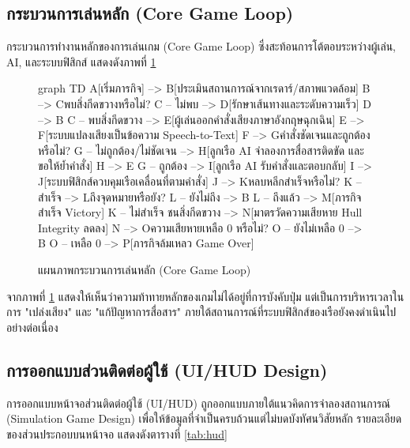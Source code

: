\subsection{กระบวนการเล่นหลัก (Core Game Loop)}

กระบวนการทำงานหลักของการเล่นเกม (Core Game Loop) ซึ่งสะท้อนการโต้ตอบระหว่างผู้เล่น, AI, และระบบฟิสิกส์ แสดงดังภาพที่ \ref{fig:gameloop}

\begin{figure}[H]
\centering
\begin{mermaid}
graph TD
    A[เริ่มภารกิจ] --> B[ประเมินสถานการณ์จากเรดาร์/สภาพแวดล้อม]
    B --> C{พบสิ่งกีดขวางหรือไม่?}
    C -- ไม่พบ --> D[รักษาเส้นทางและระดับความเร็ว]
    D --> B
    C -- พบสิ่งกีดขวาง --> E[ผู้เล่นออกคำสั่งเสียงภาษาอังกฤษฉุกเฉิน]
    E --> F[ระบบแปลงเสียงเป็นข้อความ Speech-to-Text]
    F --> G{คำสั่งชัดเจนและถูกต้องหรือไม่?}
    G -- ไม่ถูกต้อง/ไม่ชัดเจน --> H[ลูกเรือ AI จำลองการสื่อสารติดขัด และขอให้ย้ำคำสั่ง]
    H --> E
    G -- ถูกต้อง --> I[ลูกเรือ AI รับคำสั่งและตอบกลับ]
    I --> J[ระบบฟิสิกส์ควบคุมเรือเคลื่อนที่ตามคำสั่ง]
    J --> K{หลบหลีกสำเร็จหรือไม่?}
    K -- สำเร็จ --> L{ถึงจุดหมายหรือยัง?}
    L -- ยังไม่ถึง --> B
    L -- ถึงแล้ว --> M[ภารกิจสำเร็จ Victory]
    K -- ไม่สำเร็จ ชนสิ่งกีดขวาง --> N[มาตรวัดความเสียหาย Hull Integrity ลดลง]
    N --> O{ความเสียหายเหลือ 0 หรือไม่?}
    O -- ยังไม่เหลือ 0 --> B
    O -- เหลือ 0 --> P[ภารกิจล้มเหลว Game Over]
\end{mermaid}
\caption{แผนภาพกระบวนการเล่นหลัก (Core Game Loop)}
\label{fig:gameloop}
\end{figure}

จากภาพที่ \ref{fig:gameloop} แสดงให้เห็นว่าความท้าทายหลักของเกมไม่ได้อยู่ที่การบังคับปุ่ม แต่เป็นการบริหารเวลาในการ "เปล่งเสียง" และ "แก้ปัญหาการสื่อสาร" ภายใต้สถานการณ์ที่ระบบฟิสิกส์ของเรือยังคงดำเนินไปอย่างต่อเนื่อง

\subsection{การออกแบบส่วนติดต่อผู้ใช้ (UI/HUD Design)}

การออกแบบหน้าจอส่วนติดต่อผู้ใช้ (UI/HUD) ถูกออกแบบภายใต้แนวคิดการจำลองสถานการณ์ (Simulation Game Design) เพื่อให้ข้อมูลที่จำเป็นครบถ้วนแต่ไม่บดบังทัศนวิสัยหลัก รายละเอียดของส่วนประกอบบนหน้าจอ แสดงดังตารางที่ \ref{tab:hud}

